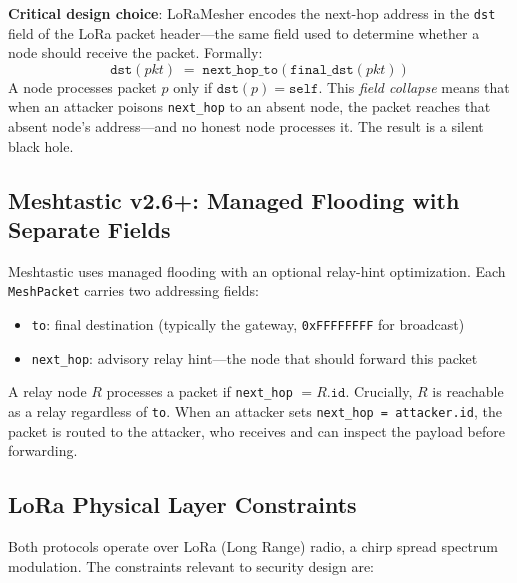 \documentclass[journal]{IEEEtran}
\begin{document}
\textbf{Critical design choice}: LoRaMesher encodes the next-hop address
in the \texttt{dst} field of the LoRa packet header---the same field used
to determine whether a node should receive the packet. Formally:
%
\begin{equation}
  \texttt{dst}(pkt) \;=\; \texttt{next\_hop\_to}(\texttt{final\_dst}(pkt))
  \label{eq:lm-collapse}
\end{equation}
%
A node processes packet $p$ only if $\texttt{dst}(p) = \texttt{self}$.
This \emph{field collapse} means that when an attacker poisons
\texttt{next\_hop} to an absent node, the packet reaches that absent node's
address---and no honest node processes it. The result is a silent black hole.

\subsection{Meshtastic v2.6+: Managed Flooding with Separate Fields}

Meshtastic uses managed flooding with an optional relay-hint optimization.
Each \texttt{MeshPacket} carries two addressing fields:
%
\begin{itemize}
  \item \texttt{to}: final destination (typically the gateway, \texttt{0xFFFFFFFF} for broadcast)
  \item \texttt{next\_hop}: advisory relay hint---the node that should forward this packet
\end{itemize}
%
A relay node $R$ processes a packet if \texttt{next\_hop} $= R.\texttt{id}$.
Crucially, $R$ is reachable as a relay regardless of \texttt{to}. When
an attacker sets \texttt{next\_hop = attacker.id}, the packet is routed
to the attacker, who receives and can inspect the payload before forwarding.

\subsection{LoRa Physical Layer Constraints}

Both protocols operate over LoRa (Long Range) radio, a chirp spread
spectrum modulation. The constraints relevant to security design are:
\end{document}
